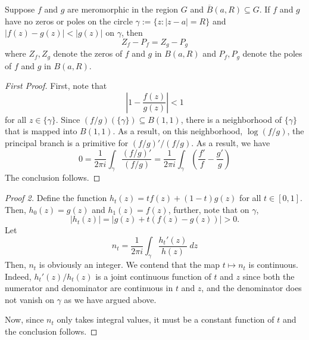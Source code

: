 \begin{theorem}[Rouch\'e]
    Suppose $f$ and $g$ are meromorphic in the region $G$ and $\overline B(a,R)\subseteq G$. If $f$ and $g$ have no zeros or poles on the circle $\gamma:= \{z: |z - a| = R\}$ and $|f(z) - g(z)| < |g(z)|$ on $\gamma$, then 
    \begin{equation*}
        Z_f - P_f = Z_g - P_g
    \end{equation*}
    where $Z_f,Z_g$ denote the zeros of $f$ and $g$ in $B(a,R)$ and $P_f,P_g$ denote the poles of $f$ and $g$ in $B(a,R)$.
\end{theorem}
\begin{proof}[First Proof]
    First, note that 
    \begin{equation*}
        \left|1 - \frac{f(z)}{g(z)}\right| < 1
    \end{equation*}
    for all $z\in\{\gamma\}$. Since $(f/g)(\{\gamma\})\subseteq B(1,1)$, there is a neighborhood of $\{\gamma\}$ that is mapped into $B(1,1)$. As a result, on this neighborhood, $\log(f/g)$, the principal branch is a primitive for $(f/g)'/(f/g)$. As a result, we have 
    \begin{equation*}
        0 = \frac{1}{2\pi i}\int_\gamma\frac{(f/g)'}{(f/g)} = \frac{1}{2\pi i}\int_\gamma\left(\frac{f'}{f} - \frac{g'}{g}\right)
    \end{equation*}
    The conclusion follows.
\end{proof}

\begin{proof}[Proof 2]
    Define the function $h_t(z) = tf(z) + (1 - t)g(z)$ for all $t\in[0,1]$. Then, $h_0(z) = g(z)$ and $h_1(z) = f(z)$, further, note that on $\gamma$,
    \begin{equation*}
        |h_t(z)| = |g(z) + t(f(z) - g(z))| > 0.
    \end{equation*}
    Let 
    \begin{equation*}
        n_t = \frac{1}{2\pi i}\int_\gamma\frac{h_t'(z)}{h(z)}~dz
    \end{equation*}
    Then, $n_t$ is obviously an integer. We contend that the map $t\mapsto n_t$ is continuous. Indeed, $h_t'(z)/h_t(z)$ is a joint continuous function of $t$ and $z$ since both the numerator and denominator are continuous in $t$ and $z$, and the denominator does not vanish on $\gamma$ as we have argued above. 

    Now, since $n_t$ only takes integral values, it must be a constant function of $t$ and the conclusion follows.
\end{proof}

